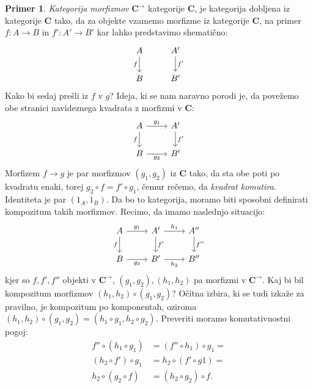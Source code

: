 \documentclass[12pt,a4paper]{book}
\theoremstyle{definition}
\theoremstyle{plain}
\theoremstyle{definition}
\newtheorem{primer}{Primer}[section]
\theoremstyle{remark}
\newcommand{\cat}[1]{\textbf{#1}}
\begin{document}
\begin{primer}
\emph{Kategorija morfizmov} $\cat{C}^{\rightarrow}$ kategorije $\cat{C}$, je kategorija dobljena iz kategorije $\cat{C}$ tako, da za objekte vzamemo morfizme iz kategorije $\cat{C}$, na primer $f : A \to B$ in $f' : A' \to B'$ kar lahko predstavimo shematično:
\[ \begin{tikzcd}
A \arrow[d, "f"'] & A' \arrow[d, "f'"] \\
B & B'
\end{tikzcd} \]
Kako bi sedaj prešli iz $f$ v $g$? Ideja, ki se nam naravno porodi je, da povežemo obe stranici navideznega kvadrata z morfizmi v $\cat{C}$:
\[ \begin{tikzcd}
A \arrow[d, "f"'] \arrow[r, "g_1"] & A' \arrow[d, "f'"] \\
B \arrow[r, "g_2"'] & B'
\end{tikzcd} \]
Morfizem $f \to g$ je par morfizmov $(g_1, g_2)$ iz $\cat{C}$ tako, da sta obe poti po kvadratu enaki, torej $g_2 \circ f = f' \circ g_1$, čemur rečemo, da \emph{kvadrat komutira}.
Identiteta je par $(1_A, 1_B)$.
Da bo to kategorija, moramo biti sposobni definirati kompozitum takih morfizmov.
Recimo, da imamo naslednjo situacijo:
%
$$\begin{tikzcd}
A \arrow[d, "f"'] \arrow[r, "g_1"] & A' \arrow[d, "f'"] \arrow[r, "h_1"] & A'' \arrow[d, "f''"] \\
B \arrow[r, "g_2"'] & B' \arrow[r, "h_2"'] & B''
\end{tikzcd}$$
%
kjer so $f, f', f''$ objekti v $\cat{C}^{\rightarrow}$, $(g_1, g_2), (h_1,h_2)$ pa morfizmi v $\cat{C}^{\rightarrow}$. Kaj bi bil kompozitum morfizmov $(h_1,h_2) \circ (g_1,g_2)$? Očitna izbira, ki se tudi izkaže za pravilno, je kompozitum po komponentah, oziroma $(h_1,h_2) \circ (g_1,g_2) = (h_1 \circ g_1, h_2 \circ g_2)$. Preveriti moramo komutativnostni pogoj:
\begin{align*}
f'' \circ (h_1 \circ g_1) &= (f'' \circ h_1) \circ g_1 = \\
(h_2 \circ f') \circ g_1 &= h_2 \circ (f' \circ g1) = \\
h_2 \circ (g_2 \circ f) &= (h_2 \circ g_2) \circ f.
\end{align*}

\end{primer}
\end{document}
